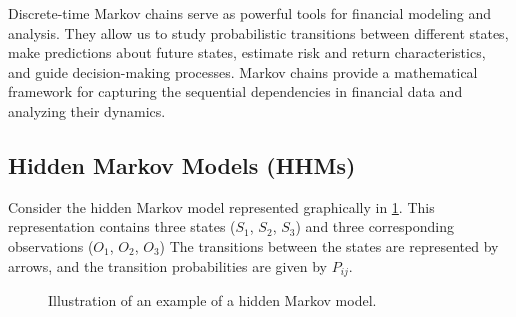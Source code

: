 \documentclass[a4paper,11pt]{article}
\begin{document}
Discrete-time Markov chains serve as powerful tools for financial modeling and analysis. They allow us to study probabilistic transitions between different states, make predictions about future states, estimate risk and return characteristics, and guide decision-making processes. Markov chains provide a mathematical framework for capturing the sequential dependencies in financial data and analyzing their dynamics.

\subsection{Hidden Markov Models (HHMs)}
\label{sec:HHM}

Consider the hidden Markov model represented graphically in \ref{HMM-Graph}. This representation
contains three states ($S_1$, $S_2$, $S_3$) and three corresponding observations ($O_1$, $O_2$, $O_3$)
The transitions between the states are represented by arrows, and the transition probabilities
are given by $P_{ij}$.
\begin{figure}[h]
    \label{HMM-Graph}
    \centering
    

    \caption{Illustration of an example of a hidden Markov model.}
\end{figure}
\end{document}
